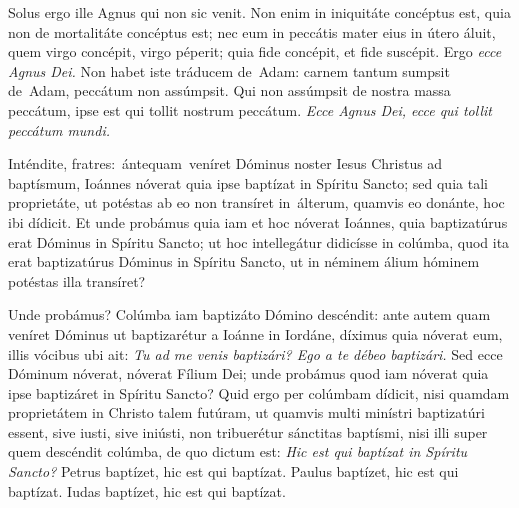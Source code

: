 {{\noindent Solus ergo ille Agnus qui non sic venit. Non enim in iniquitáte concéptus est, quia non de mortalitáte concéptus est; nec eum in peccátis mater eius in útero áluit, quem virgo concépit, virgo péperit; quia fide concépit, et fide suscépit. Ergo \emph{ecce Agnus Dei.} Non habet iste tráducem de Adam: carnem tantum sumpsit de Adam, peccátum non assúmpsit. Qui non assúmpsit de nostra massa peccátum, ipse est qui tollit nostrum peccátum. \emph{Ecce Agnus Dei, ecce qui tollit peccátum mundi.}}

\noindent Inténdite, fratres: ántequam veníret Dóminus noster Iesus Christus ad baptísmum, Ioánnes nóverat quia ipse baptízat in Spíritu Sancto; sed quia tali proprietáte, ut potéstas ab eo non transíret in álterum, quamvis eo donánte, hoc ibi dídicit. Et unde probámus quia iam et hoc nóverat Ioánnes, quia baptizatúrus erat Dóminus in Spíritu Sancto; ut hoc intellegátur didicísse in colúmba, quod ita erat baptizatúrus Dóminus in Spíritu Sancto, ut in néminem álium hóminem potéstas illa transíret?

\noindent Unde probámus? Colúmba iam baptizáto Dómino descéndit: ante autem quam veníret Dóminus ut baptizarétur a Ioánne in Iordáne, díximus quia nóverat eum, illis vócibus ubi ait: \emph{Tu ad me venis baptizári? Ego a te débeo baptizári.} Sed ecce Dóminum nóverat, nóverat Fílium Dei; unde probámus quod iam nóverat quia ipse baptizáret in Spíritu Sancto? Quid ergo per colúmbam dídicit, nisi quamdam proprietátem in Christo talem futúram, ut quamvis multi minístri baptizatúri essent, sive iusti, sive iniústi, non tribuerétur sánctitas baptísmi, nisi illi super quem descéndit colúmba, de quo dictum est: \emph{Hic est qui baptízat in Spíritu Sancto?} Petrus baptízet, hic est qui baptízat. Paulus baptízet, hic est qui baptízat. Iudas baptízet, hic est qui baptízat.

\vfill
\pagebreak

 

\vspace{-5mm}



\vspace{3mm}

 

\vspace{-5mm}


\vfill
\pagebreak
}
